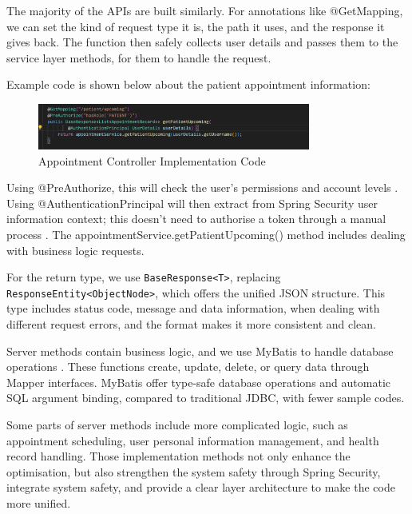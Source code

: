 The majority of the APIs are built similarly. For annotations like @GetMapping, we can set the kind of request type it is, the path it uses, and the response it gives back. The function then safely collects user details and passes them to the service layer methods, for them to handle the request.

Example code is shown below about the patient appointment information:

\begin{figure}[h]
\centering
\includegraphics[width=0.8\textwidth]{chapters/chapter03/images03/3-3-1-figure(API-I).png}
\caption{Appointment Controller Implementation Code}
\label{fig:appointment-controller}
\end{figure}

Using @PreAuthorize, this will check the user's permissions and account levels \cite{springsecurity2024}. Using @AuthenticationPrincipal will then extract from Spring Security user information context; this doesn't need to authorise a token through a manual process \cite{johnson2023}.
The appointmentService.getPatientUpcoming() method includes dealing with business logic requests.

For the return type, we use \texttt{BaseResponse<T>}, replacing \texttt{ResponseEntity<ObjectNode>}, which offers the unified JSON structure. This type includes status code, message and data information, when dealing with different request errors, and the format makes it more consistent and clean.

Server methods contain business logic, and we use MyBatis to handle database operations \cite{springsecurity2024}. These functions create, update, delete, or query data through Mapper interfaces. MyBatis offer type-safe database operations and automatic SQL argument binding, compared to traditional JDBC, with fewer sample codes.

Some parts of server methods include more complicated logic, such as appointment scheduling, user personal information management, and health record handling. Those implementation methods not only enhance the optimisation, but also strengthen the system safety through Spring Security, integrate system safety, and provide a clear layer architecture to make the code more unified.
